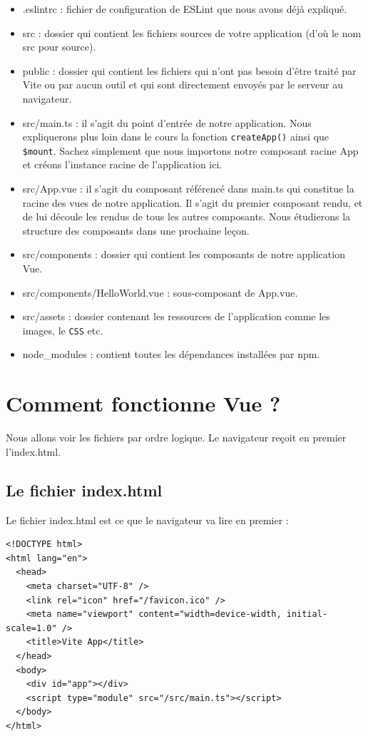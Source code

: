 \documentclass{article}
\begin{document}
\begin{itemize}
\item  {\color{blue} .eslintrc}  : fichier de configuration de {\color{monOrange} ESLint} que nous avons déjà expliqué.
\item  {\color{blue} src } : dossier qui contient les fichiers sources de votre application (d'où le nom {\color{monOrange} src} pour source).
\item  {\color{blue} public}  : dossier qui contient les fichiers qui n'ont pas besoin d'être traité par {\color{monOrange} Vite} ou par aucun outil et qui sont directement envoyés par le serveur au navigateur.
\item  {\color{blue} src/main.ts}  : il s'agit du point d'entrée de notre application. Nous expliquerons plus loin dans le cours la fonction {\tt createApp()} ainsi que {\tt \$mount}. Sachez simplement que nous importons notre composant racine {\color{monOrange} App} et créons l'instance racine de l'application ici.
\item  {\color{blue} src/App.vue}  : il s'agit du composant référencé dans {\color{monOrange} main.ts} qui constitue la racine des vues de notre application. Il s'agit du premier composant rendu, et de lui découle les rendus de tous les autres composants. Nous étudierons la structure des composants dans une prochaine leçon.
\item  {\color{blue} src/components}  : dossier qui contient les composants de notre application {\color{monOrange} Vue}.
\item  {\color{blue} src/components/HelloWorld.vue}  : sous-composant de {\color{monOrange} App.vue}.
\item  {\color{blue} src/assets}  : dossier contenant les ressources de l'application comme les images, le {\tt CSS} etc.
\item  {\color{blue} node\_modules}  : contient toutes les dépendances installées par {\color{monOrange} npm}.
\end{itemize}



\section{Comment fonctionne Vue ?}
Nous allons voir les fichiers par ordre logique. Le navigateur reçoit en premier l'{\color{monOrange}index.html}.

\subsection{Le fichier {\color{monOrange}index.html}}
Le fichier index.html est ce que le navigateur va lire en premier :
\begin{verbatim}
<!DOCTYPE html>
<html lang="en">
  <head>
    <meta charset="UTF-8" />
    <link rel="icon" href="/favicon.ico" />
    <meta name="viewport" content="width=device-width, initial-scale=1.0" />
    <title>Vite App</title>
  </head>
  <body>
    <div id="app"></div>
    <script type="module" src="/src/main.ts"></script>
  </body>
</html>
\end{verbatim} 
\end{document}

